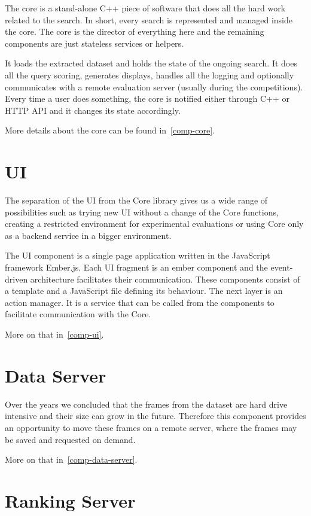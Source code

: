 The core is a stand-alone C++ piece of software that does all the hard work related to the search. In short, every search is represented and managed inside the core. The core is the director of everything here and the remaining components are just stateless services or helpers.

It loads the extracted dataset and holds the state of the ongoing search. It does all the query scoring, generates displays, handles all the logging and optionally communicates with a remote evaluation server (usually during the competitions). Every time a user does something, the core is notified either through C++ or HTTP API and it changes its state accordingly. 

More details about the core can be found in~\cref{comp-core}.

\section{UI}

The separation of the UI from the Core library gives us a wide range of possibilities such as trying new UI without a change of the Core functions, creating a restricted environment for experimental evaluations or using Core only as a backend service in a bigger environment. 

The UI component is a single page application written in the JavaScript framework Ember.js. Each UI fragment is an ember component and the event-driven architecture facilitates their communication. These components consist of a template and a JavaScript file defining its behaviour. The next layer is an action manager. It is a service that can be called from the components to facilitate communication with the Core. 

More on that in~\cref{comp-ui}.

\section{Data Server}

Over the years we concluded that the frames from the dataset are hard drive intensive and their size can grow in the future. Therefore this component provides an opportunity to move these frames on a remote server, where the frames may be saved and requested on demand. 

More on that in~\cref{comp-data-server}.

\section{Ranking Server}

